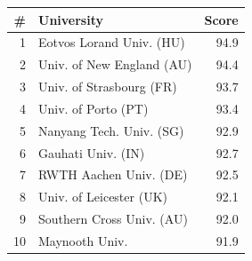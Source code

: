 \begin{tabular}{rlr}
\toprule
\# & University & Score \\
\midrule
1 & Eotvos Lorand Univ. (HU) & 94.9 \\
2 & Univ. of New England (AU) & 94.4 \\
3 & Univ. of Strasbourg (FR) & 93.7 \\
4 & Univ. of Porto (PT) & 93.4 \\
5 & Nanyang Tech. Univ. (SG) & 92.9 \\
6 & Gauhati Univ. (IN) & 92.7 \\
7 & RWTH Aachen Univ. (DE) & 92.5 \\
8 & Univ. of Leicester (UK) & 92.1 \\
9 & Southern Cross Univ. (AU) & 92.0 \\
10 & Maynooth Univ. & 91.9 \\
\bottomrule
\end{tabular}
